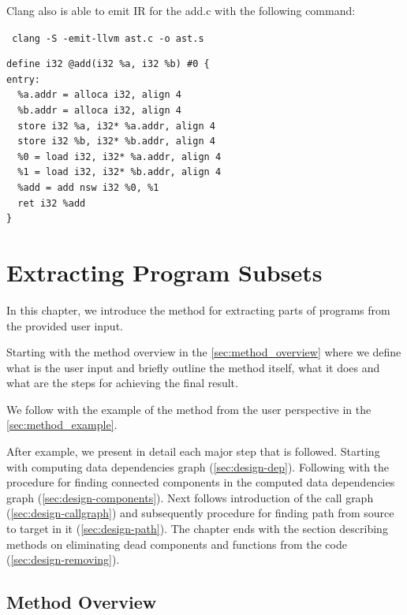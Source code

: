 \documentclass[12pt, twoside]{fithesis2}
\renewcommand{\_}{\leavevmode \kern0.07em\vbox{\hrule width0.4em}}
\begin{document}
Clang also is able to emit IR for the add.c with the following command:

\texttt{
clang -S -emit-llvm ast.c -o ast.s
}

\begin{verbatim}
define i32 @add(i32 %a, i32 %b) #0 {
entry:
  %a.addr = alloca i32, align 4
  %b.addr = alloca i32, align 4
  store i32 %a, i32* %a.addr, align 4
  store i32 %b, i32* %b.addr, align 4
  %0 = load i32, i32* %a.addr, align 4
  %1 = load i32, i32* %b.addr, align 4
  %add = add nsw i32 %0, %1
  ret i32 %add
}
\end{verbatim}


\chapter{Extracting Program Subsets}
\label{chap:design}

In this chapter, we introduce the method for extracting parts of programs
from the provided user input.

Starting with the method overview in the \autoref{sec:method_overview} where we
define what is the user input and briefly outline the method itself, what it
does and what are the steps for achieving the final result.

We follow with the example of the method from the user perspective in the
\autoref{sec:method_example}.

After example, we present in detail each major step that is followed.
Starting with computing data dependencies graph
(\autoref{sec:design-dep}).
Following with the procedure for finding connected components in the computed
data dependencies graph (\autoref{sec:design-components}).
Next follows introduction of the call graph (\autoref{sec:design-callgraph}) and
subsequently procedure for finding path from source to target in it
(\autoref{sec:design-path}).
The chapter ends with the section describing methods on eliminating dead
components and functions from the code (\autoref{sec:design-removing}).


\section{Method Overview}
\label{sec:method_overview}
\end{document}
